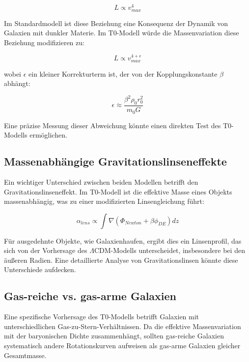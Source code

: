 \documentclass[a4paper,12pt]{article}
\begin{document}
	\begin{equation}
		L \propto v_{max}^{4}
	\end{equation}
	
	Im Standardmodell ist diese Beziehung eine Konsequenz der Dynamik von Galaxien mit dunkler Materie. Im T0-Modell würde die Massenvariation diese Beziehung modifizieren zu:
	
	\begin{equation}
		L \propto v_{max}^{4+\epsilon}
	\end{equation}
	
	wobei $\epsilon$ ein kleiner Korrekturterm ist, der von der Kopplungskonstante $\beta$ abhängt:
	
	\begin{equation}
		\epsilon \approx \frac{\beta^2 \rho_0 r_0^2}{m_0 G}
	\end{equation}
	
	Eine präzise Messung dieser Abweichung könnte einen direkten Test des T0-Modells ermöglichen.
	
	\subsection{Massenabhängige Gravitationslinseneffekte}
	
	Ein wichtiger Unterschied zwischen beiden Modellen betrifft den Gravitationslinseneffekt. Im T0-Modell ist die effektive Masse eines Objekts massenabhängig, was zu einer modifizierten Linsengleichung führt:
	
	\begin{equation}
		\alpha_{lens} \propto \int \nabla(\Phi_{Newton} + \beta\phi_{DE}) dz
	\end{equation}
	
	Für ausgedehnte Objekte, wie Galaxienhaufen, ergibt dies ein Linsenprofil, das sich von der Vorhersage des $\Lambda$CDM-Modells unterscheidet, insbesondere bei den äußeren Radien. Eine detaillierte Analyse von Gravitationslinsen könnte diese Unterschiede aufdecken.
	
	\subsection{Gas-reiche vs. gas-arme Galaxien}
	
	Eine spezifische Vorhersage des T0-Modells betrifft Galaxien mit unterschiedlichen Gas-zu-Stern-Verhältnissen. Da die effektive Massenvariation mit der baryonischen Dichte zusammenhängt, sollten gas-reiche Galaxien systematisch andere Rotationskurven aufweisen als gas-arme Galaxien gleicher Gesamtmasse.
	
\end{document}
